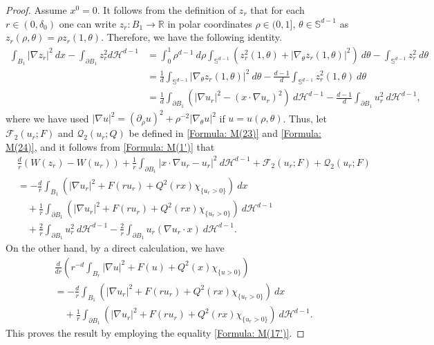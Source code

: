 \documentclass[11pt,reqno]{amsart}
\begin{document}
\begin{proof}
	Assume $x^{0}=0$. It follows from the definition of $z_{r}$ that for each $r\in(0,\delta_{0})$ one can write $z_{r}\colon B_{1}\to\mathbb{R}$ in polar coordinates $\rho\in(0,1]$, $\theta\in\mathbb{S}^{d-1}$ as $z_{r}(\rho,\theta)=\rho z_{r}(1,\theta)$. Therefore, we have the following identity.
    \begin{align*}
    	\int_{B_{1}}|\nabla z_{r}|^{2}\:dx-\int_{\partial B_{1}}z_{r}^{2}d\mathcal{H}^{d-1}&=\int_{0}^{1}\rho^{d-1}\:d\rho\int_{\mathbb{S}^{d-1}}(z_{r}^{2}(1,\theta)+|\nabla_{\theta}z_{r}(1,\theta)|^{2})\:d\theta-\int_{\mathbb{S}^{d-1}}z_{r}^{2}\:d\theta\\
    	&=\frac{1}{d}\int_{\mathbb{S}^{d-1}}|\nabla_{\theta}z_{r}(1,\theta)|^{2}\:d\theta-\frac{d-1}{d}\int_{\mathbb{S}^{d-1}}z_{r}^{2}(1,\theta)\:d\theta\\
    	&=\frac{1}{d}\int_{\partial B_{1}}(|\nabla u_{r}|^{2}-(x\cdot\nabla u_{r})^{2})\:d\mathcal{H}^{d-1}-\frac{d-1}{d}\int_{\partial B_{1}}u_{r}^{2}\:d\mathcal{H}^{d-1},
    \end{align*}
    where we have used $|\nabla u|^{2}=(\partial_{\rho}u)^{2}+\rho^{-2}|\nabla_{\theta}u|^{2}$ if $u=u(\rho,\theta)$. Thus, let $\mathcal{F}_{2}(u_{r};F)$ and $\mathcal{Q}_{2}(u_{r};Q)$ be defined in \eqref{Formula: M(23)} and \eqref{Formula: M(24)}, and it follows from \eqref{Formula: M(1')} that
    \begin{align*}
    	&\frac{d}{r}(W(z_{r})-W(u_{r}))+\frac{1}{r}\int_{\partial B_{1}}|x\cdot \nabla u_{r}-u_{r}|^{2}\:d\mathcal{H}^{d-1}+\mathcal{F}_{2}(u_{r};F)+\mathcal{Q}_{2}(u_{r};F)\\
    	&=-\frac{d}{r}\int_{B_{1}}(|\nabla u_{r}|^{2}+F(ru_{r})+Q^{2}(rx)\chi_{\{u_{r}>0\}})\:dx\\
    	&\quad+\frac{1}{r}\int_{\partial B_{1}}(|\nabla u_{r}|^{2}+F(ru_{r})+Q^{2}(rx)\chi_{\{u_{r}>0\}})\:d\mathcal{H}^{d-1}\\
    	&\quad+\frac{2}{r}\int_{\partial B_{1}}u_{r}^{2}\:d\mathcal{H}^{d-1}-\frac{2}{r}\int_{\partial B_{1}}u_{r}(\nabla u_{r}\cdot x)\:d\mathcal{H}^{d-1}.
    \end{align*}
    On the other hand, by a direct calculation, we have
    \begin{align*}
    	&\frac{d}{dr}\left(r^{-d}\int_{B_{r}}|\nabla u|^{2}+F(u)+Q^{2}(x)\chi_{\{ u>0\}}\right)\\
    	&=-\frac{d}{r}\int_{B_{1}}(|\nabla u_{r}|^{2}+F(ru_{r})+Q^{2}(rx)\chi_{\{u_{r}>0\}})\:dx\\
    	&\quad+\frac{1}{r}\int_{\partial B_{1}}(|\nabla u_{r}|^{2}+F(ru_{r})+Q^{2}(rx)\chi_{\{u_{r}>0\}})\:d\mathcal{H}^{d-1}.
    \end{align*}
    This proves the result by employing the equality \eqref{Formula: M(17')}.
\end{proof}
\end{document}
